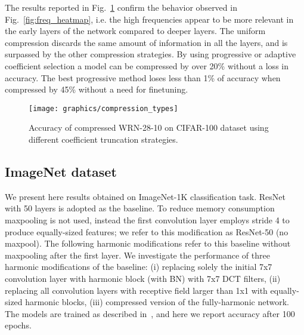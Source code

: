 \documentclass[12pt,a4paper]{article}
\begin{document}
The results reported in Fig.~\ref{fig:compression_types} confirm the behavior observed in Fig.~\ref{fig:freq_heatmap}, i.e. the high frequencies appear to be more relevant in the early layers of the network compared to deeper layers. The uniform compression discards the same amount of information in all the layers, and is surpassed by the other compression strategies. By using progressive or adaptive coefficient selection a model can be compressed by over 20\% without a loss in accuracy. The best progressive method loses less than 1\% of accuracy when compressed by 45\% without a need for finetuning.

\begin{figure}
\begin{center}
  \texttt{[image: graphics/compression\_types]}
\end{center}
\vspace{-.5\baselineskip}
\caption{Accuracy of compressed WRN-28-10 on CIFAR-100 dataset using different coefficient truncation strategies.}
\label{fig:compression_types}
\end{figure}

\subsection{ImageNet dataset} 
\label{sec:experiments.imagenet}

We present here results obtained on ImageNet-1K classification task.
ResNet~\cite{He16} with 50 layers is adopted as the baseline. 
To reduce memory consumption maxpooling is not used, instead the first convolution layer employs stride 4 to produce equally-sized features; we refer to this modification as ResNet-50 (no maxpool). The following harmonic modifications refer to this baseline without maxpooling after the first layer. We investigate the performance of three harmonic modifications of the baseline: (i) replacing solely the initial 7x7 convolution layer with harmonic block (with BN) with 7x7 DCT filters, (ii) replacing all convolution layers with receptive field larger than 1x1 with equally-sized harmonic blocks, (iii) compressed version of the fully-harmonic network.
The models are trained as described in~\cite{Ulicny19b}, and here we report accuracy after 100 epochs.
\end{document}

